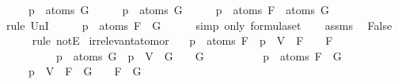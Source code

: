 \begin{isabellebody}
\ \ \ \ \ {\isachardoublequoteopen}p\ {\isasymnotin}\ atoms\ G{\isachardoublequoteclose}\isanewline
%
\isadelimproof
%
\endisadelimproof
%
\isatagproof
{}\isamarkupfalse%
\ \isanewline
\ \ \isamarkupfalse%
\ {\isachardoublequoteopen}p\ {\isasymin}\ atoms\ G{\isachardoublequoteclose}\isanewline
\ \ \isamarkupfalse%
\ \isamarkupfalse%
\ {\isachardoublequoteopen}p\ {\isasymin}\ atoms\ F\ {\isasymunion}\ atoms\ G{\isachardoublequoteclose}\isanewline
\ \ \ \ \isamarkupfalse%
\ {\isacharparenleft}rule\ UnI{}{\isacharparenright}\isanewline
\ \ \isamarkupfalse%
\ \isamarkupfalse%
\ {\isachardoublequoteopen}p\ {\isasymin}\ atoms\ {\isacharparenleft}F\ \isactrlbold {\isasymor}\ G{\isacharparenright}{\isachardoublequoteclose}\isanewline
\ \ \ \ \isamarkupfalse%
\ {\isacharparenleft}simp\ only{\isacharcolon}\ formula{\isachardot}set{\isacharparenleft}{}{\isacharparenright}{\isacharparenright}\isanewline
\ \ \isamarkupfalse%
\ assms\ \isamarkupfalse%
\ False\ \isanewline
\ \ \ \ \isamarkupfalse%
\ {\isacharparenleft}rule\ notE{\isacharparenright}\isanewline
{}\isamarkupfalse%
%
\endisatagproof
{\isafoldproof}%
%
\isadelimproof
\isanewline
%
\endisadelimproof
\isanewline
{}\isamarkupfalse%
\ irrelevant{\isacharunderscore}atom{\isacharunderscore}or{\isacharcolon}\isanewline
\ \ \ {\isachardoublequoteopen}p\ {\isasymnotin}\ atoms\ F\ {\isasymLongrightarrow}\ {\isasymA}{\isacharparenleft}p\ {\isacharcolon}{\isacharequal}\ V{\isacharparenright}\ {\isasymTurnstile}\ F\ {\isasymlongleftrightarrow}\ {\isasymA}\ {\isasymTurnstile}\ F{\isachardoublequoteclose}\isanewline
\ \ \ \ \ \ \ \ \ \ {\isachardoublequoteopen}p\ {\isasymnotin}\ atoms\ G\ {\isasymLongrightarrow}\ {\isasymA}{\isacharparenleft}p\ {\isacharcolon}{\isacharequal}\ V{\isacharparenright}\ {\isasymTurnstile}\ G\ {\isasymlongleftrightarrow}\ {\isasymA}\ {\isasymTurnstile}\ G{\isachardoublequoteclose}\isanewline
\ \ \ \ \ \ \ \ \ \ {\isachardoublequoteopen}p\ {\isasymnotin}\ atoms\ {\isacharparenleft}F\ \isactrlbold {\isasymor}\ G{\isacharparenright}{\isachardoublequoteclose}\isanewline
\ \ \ \ \ {\isachardoublequoteopen}{\isasymA}{\isacharparenleft}p\ {\isacharcolon}{\isacharequal}\ V{\isacharparenright}\ {\isasymTurnstile}\ {\isacharparenleft}F\ \isactrlbold {\isasymor}\ G{\isacharparenright}\ {\isasymlongleftrightarrow}\ {\isasymA}\ {\isasymTurnstile}\ {\isacharparenleft}F\ \isactrlbold {\isasymor}\ G{\isacharparenright}{\isachardoublequoteclose}\isanewline

\end{isabellebody}
